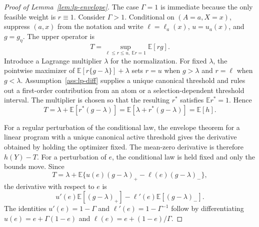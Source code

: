 \documentclass[11pt]{article}
\newcommand{\E}{\mathbb{E}}
\theoremstyle{definition}
\theoremstyle{plain}
\theoremstyle{remark}
\begin{document}
\begin{proof}[Proof of Lemma~\ref{lem:lp-envelope}]
The case \(\Gamma=1\) is immediate because the only feasible weight is
\(r\equiv1\).  Consider \(\Gamma>1\).  Conditional on \((A=a,X=x)\), suppress
\((a,x)\) from the notation and write \(\ell=\ell_a(x)\), \(u=u_a(x)\), and
\(g=g_\eta\).  The upper operator is
\[
T=\sup_{\ell\le r\le u,\ \E r=1}\E[rg].
\]
Introduce a Lagrange multiplier \(\lambda\) for the normalization.  For fixed
\(\lambda\), the pointwise maximizer of
\(\E[r\{g-\lambda\}]+\lambda\) sets \(r=u\) when \(g>\lambda\) and \(r=\ell\)
when \(g<\lambda\).  Assumption~\ref{ass:lp-diff} supplies a unique canonical
threshold and rules out a first-order contribution from an atom or a
selection-dependent threshold interval.  The multiplier is chosen so that the
resulting \(r^*\) satisfies \(\E r^*=1\).  Hence
\[
T
=
\lambda+\E[r^*(g-\lambda)]
=
\E[\lambda+r^*(g-\lambda)]
=
\E[h].
\]

For a regular perturbation of the conditional law, the envelope theorem for a
linear program with a unique canonical active threshold gives the derivative
obtained by holding the optimizer fixed.  The mean-zero derivative is therefore
\(h(Y)-T\).  For a perturbation of \(e\), the conditional law is held fixed and
only the bounds move.  Since
\[
T
=
\lambda+
\E\{u(e)(g-\lambda)_+-\ell(e)(g-\lambda)_-\},
\]
the derivative with respect to \(e\) is
\[
u'(e)\E[(g-\lambda)_+]-\ell'(e)\E[(g-\lambda)_-].
\]
The identities \(u'(e)=1-\Gamma\) and \(\ell'(e)=1-\Gamma^{-1}\) follow by
differentiating \(u(e)=e+\Gamma(1-e)\) and
\(\ell(e)=e+(1-e)/\Gamma\).
\end{proof}
\end{document}
